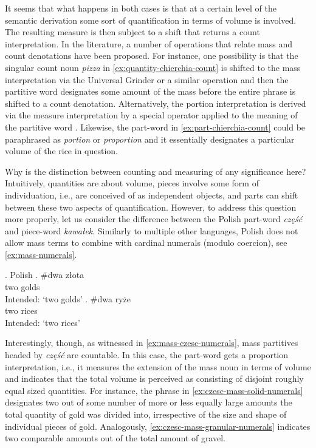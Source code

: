 It seems that what happens in both cases is that at a certain level of the semantic derivation some sort of quantification in terms of volume is involved. The resulting measure is then subject to a shift that returns a count interpretation. In the literature, a number of operations that relate mass and count denotations have been proposed. For instance, one possibility is that the singular count noun \textit{pizza} in \ref{ex:quantity-chierchia-count} is shifted to the mass interpretation via the Universal Grinder \citep{pelletier1975nonsingular} or a similar operation and then the partitive word designates some amount of the mass before the entire phrase is shifted to a count denotation. Alternatively, the portion interpretation is derived via the measure interpretation by a special operator applied to the meaning of the partitive word \citep{khrizman_et-al2015portion}. Likewise, the part-word in \ref{ex:part-chierchia-count} could be paraphrased as \textit{portion} or \textit{proportion} and it essentially designates a particular volume of the rice in question.

Why is the distinction between counting and measuring of any significance here? Intuitively, quantities are about volume, pieces involve some form of individuation, i.e., are conceived of as independent objects, and parts can shift between these two aspects of quantification. However, to address this question more properly, let us consider the difference between the Polish part-word \textit{część} and piece-word \textit{kawałek}. Similarly to multiple other languages, Polish does not allow mass terms to combine with cardinal numerals (modulo coercion), see \ref{ex:mass-numerals}.

\ex. Polish\label{ex:mass-numerals}
  \ag. \#dwa złota\label{ex:mass-solid-numerals}\\
  two golds\\
  Intended: `two golds'
  \bg. \#dwa ryże\label{ex:mass-granular-numerals}\\
  two rices\\
  Intended: `two rices'

Interestingly, though, as witnessed in \ref{ex:mass-czesc-numerals}, mass partitives headed by \textit{część} are countable. In this case, the part-word gets a proportion interpretation, i.e., it measures the extension of the mass noun in terms of volume and indicates that the total volume is perceived as consisting of disjoint roughly equal sized quantities. For instance, the phrase in \ref{ex:czesc-mass-solid-numerals} designates two out of some number of more or less equally large amounts the total quantity of gold was divided into, irrespective of the size and shape of individual pieces of gold. Analogously, \ref{ex:czesc-mass-granular-numerals} indicates two comparable amounts out of the total amount of gravel.

